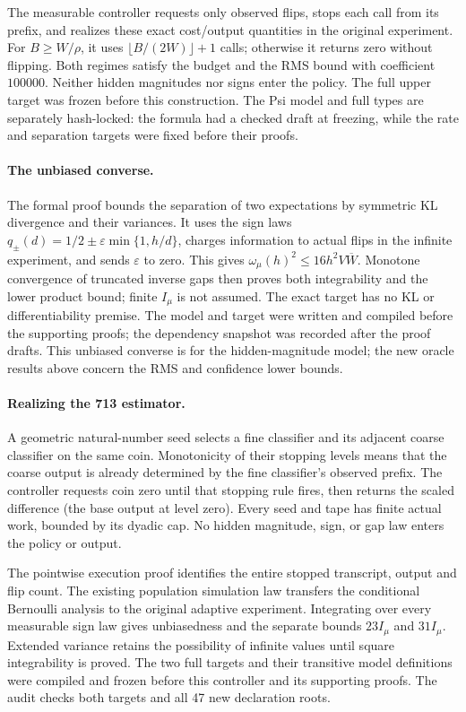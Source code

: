 The measurable controller requests only observed flips, stops each call
from its prefix, and realizes these exact cost/output quantities in the
original experiment. For $B\ge W/\rho$, it uses
$\lfloor B/(2W)\rfloor+1$ calls; otherwise it returns zero without flipping.
Both regimes satisfy the budget and the RMS bound with coefficient $100000$.
Neither hidden magnitudes nor signs enter the policy. The full upper target
was frozen before this construction. The Psi model and full types are
separately hash-locked: the formula had a checked draft at freezing, while
the rate and separation targets were fixed before their proofs.

\paragraph{The unbiased converse.}
The formal proof bounds the separation of two expectations by symmetric
KL divergence and their variances. It uses the sign laws
$q_\pm(d)=1/2\pm\varepsilon\min\{1,h/d\}$, charges information to actual
flips in the infinite experiment, and sends $\varepsilon$ to zero. This
gives $\omega_\mu(h)^2\le16h^2V\overline W$. Monotone convergence of
truncated inverse gaps then proves both integrability and the lower product
bound; finite $I_\mu$ is not assumed. The exact target has no KL or
differentiability premise. The model and target were written and compiled
before the supporting proofs; the dependency snapshot was recorded after
the proof drafts. This unbiased converse is for the hidden-magnitude model;
the new oracle results above concern the RMS and confidence lower bounds.

\paragraph{Realizing the 713 estimator.}
A geometric natural-number seed selects a fine classifier and its adjacent
coarse classifier on the same coin. Monotonicity of their stopping levels
means that the coarse output is already determined by the fine classifier's
observed prefix. The controller requests coin zero until that stopping rule
fires, then returns the scaled difference (the base output at level zero).
Every seed and tape has finite actual work, bounded by its dyadic cap.
No hidden magnitude, sign, or gap law enters the policy or output.

The pointwise execution proof identifies the entire stopped transcript,
output and flip count. The existing population simulation law transfers
the conditional Bernoulli analysis to the original adaptive experiment.
Integrating over every measurable sign law gives unbiasedness and the
separate bounds $23I_\mu$ and $31I_\mu$. Extended variance retains the
possibility of infinite values until square integrability is proved.
The two full targets and their transitive model definitions were compiled
and frozen before this controller and its supporting proofs. The audit
checks both targets and all 47 new declaration roots.

